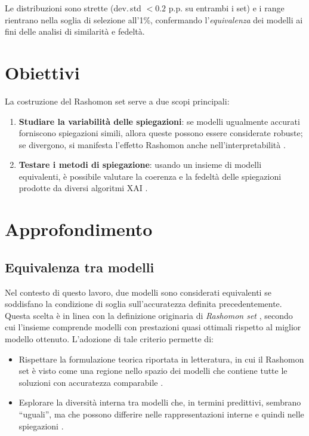 \documentclass[12pt,a4paper,oneside]{report}
\numberwithin{figure}{chapter}
\numberwithin{table}{chapter}
\begin{document}
\noindent
Le distribuzioni sono strette (dev.\,std $< 0.2$ p.p. su entrambi i set) e
i range rientrano nella soglia di selezione all’1\%, confermando l’\emph{equivalenza}
dei modelli ai fini delle analisi di similarità e fedeltà.

\section{Obiettivi}
La costruzione del Rashomon set serve a due scopi principali:
\begin{enumerate}
      \item \textbf{Studiare la variabilità delle spiegazioni}: se modelli ugualmente accurati forniscono spiegazioni simili, allora queste possono essere considerate robuste; se divergono, si manifesta l’effetto Rashomon anche nell’interpretabilità \citep{mueller2023rashomon}.
      \item \textbf{Testare i metodi di spiegazione}: usando un insieme di modelli equivalenti, è possibile valutare la coerenza e la fedeltà delle spiegazioni prodotte da diversi algoritmi XAI \citep{leventi2023consistency}.
\end{enumerate}

\section{Approfondimento}
\subsection{Equivalenza tra modelli}
Nel contesto di questo lavoro, due modelli sono considerati equivalenti se
soddisfano la condizione di soglia sull’accuratezza definita precedentemente.
Questa scelta è in linea con la definizione originaria di \emph{Rashomon set}
\citep{fisher2019all}, secondo cui l’insieme comprende modelli con prestazioni
quasi ottimali rispetto al miglior modello ottenuto. L’adozione di tale
criterio permette di:
\begin{itemize}
      \item Rispettare la formulazione teorica riportata in letteratura, in cui il Rashomon
            set è visto come una regione nello spazio dei modelli che contiene tutte le
            soluzioni con accuratezza comparabile \citep{mueller2023rashomon}.
      \item Esplorare la diversità interna tra modelli che, in termini predittivi, sembrano
            “uguali”, ma che possono differire nelle rappresentazioni interne e quindi
            nelle spiegazioni \citep{leventi2023consistency}.
\end{itemize}
\end{document}
